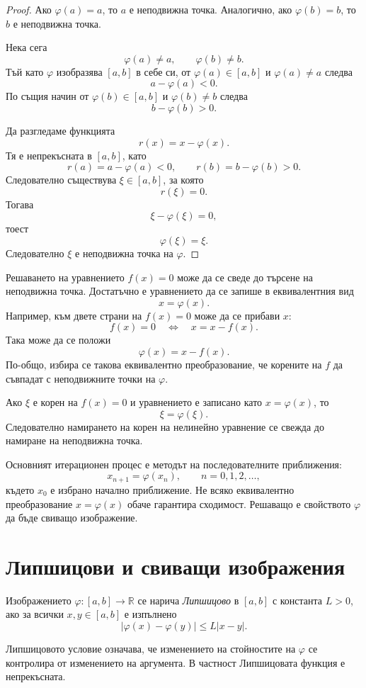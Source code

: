 \begin{proof}
Ако $\varphi(a)=a$, то $a$ е неподвижна точка. Аналогично, ако $\varphi(b)=b$, то $b$ е неподвижна точка.

Нека сега
\[
\varphi(a)\neq a,\qquad \varphi(b)\neq b.
\]
Тъй като $\varphi$ изобразява $[a,b]$ в себе си, от $\varphi(a)\in[a,b]$ и $\varphi(a)\neq a$ следва
\[
a-\varphi(a)<0.
\]
По същия начин от $\varphi(b)\in[a,b]$ и $\varphi(b)\neq b$ следва
\[
b-\varphi(b)>0.
\]

Да разгледаме функцията
\[
r(x)=x-\varphi(x).
\]
Тя е непрекъсната в $[a,b]$, като
\[
r(a)=a-\varphi(a)<0,\qquad r(b)=b-\varphi(b)>0.
\]
Следователно съществува $\xi\in[a,b]$, за която
\[
r(\xi)=0.
\]
Тогава
\[
\xi-\varphi(\xi)=0,
\]
тоест
\[
\varphi(\xi)=\xi.
\]
Следователно $\xi$ е неподвижна точка на $\varphi$.
\end{proof}

Решаването на уравнението $f(x)=0$ може да се сведе до търсене на неподвижна точка. Достатъчно е уравнението да се запише в еквивалентния вид
\[
x=\varphi(x).
\]
Например, към двете страни на $f(x)=0$ може да се прибави $x$:
\[
f(x)=0
\quad\Longleftrightarrow\quad
x=x-f(x).
\]
Така може да се положи
\[
\varphi(x)=x-f(x).
\]
По-общо, избира се такова еквивалентно преобразование, че корените на $f$ да съвпадат с неподвижните точки на $\varphi$.

Ако $\xi$ е корен на $f(x)=0$ и уравнението е записано като $x=\varphi(x)$, то
\[
\xi=\varphi(\xi).
\]
Следователно намирането на корен на нелинейно уравнение се свежда до намиране на неподвижна точка.

Основният итерационен процес е методът на последователните приближения:
\[
x_{n+1}=\varphi(x_n),\qquad n=0,1,2,\ldots,
\]
където $x_0$ е избрано начално приближение. Не всяко еквивалентно преобразование $x=\varphi(x)$ обаче гарантира сходимост. Решаващо е свойството $\varphi$ да бъде свиващо изображение.

\section{Липшицови и свиващи изображения}\label{s:34.2}

\begin{defn}
Изображението $\varphi:[a,b]\to\mathbb{R}$ се нарича \emph{Липшицово} в $[a,b]$ с константа $L>0$, ако за всички $x,y\in[a,b]$ е изпълнено
\[
|\varphi(x)-\varphi(y)|\leq L|x-y|.
\]
\end{defn}

Липшицовото условие означава, че изменението на стойностите на $\varphi$ се контролира от изменението на аргумента. В частност Липшицовата функция е непрекъсната.

